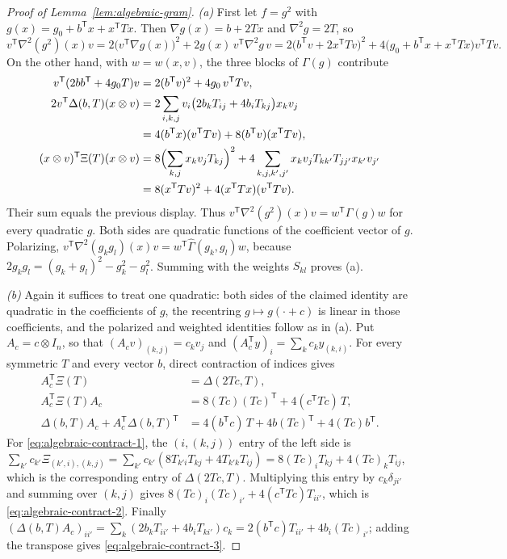 \begin{proof}[Proof of Lemma~\ref{lem:algebraic-gram}]
\emph{(a)} First let $f=g^2$ with $g(x)=g_0+b^{\mathsf T}x+x^{\mathsf T}Tx$.
Then $\nabla g(x)=b+2Tx$ and $\nabla^2g=2T$, so
\[
 v^{\mathsf T}\nabla^2(g^2)(x)v
 =2\bigl(v^{\mathsf T}\nabla g(x)\bigr)^2+2g(x)\,v^{\mathsf T}\nabla^2g\,v
 =2\bigl(b^{\mathsf T}v+2x^{\mathsf T}Tv\bigr)^2
  +4\bigl(g_0+b^{\mathsf T}x+x^{\mathsf T}Tx\bigr)v^{\mathsf T}Tv .
\]
On the other hand, with $w=w(x,v)$, the three blocks of $\Gamma(g)$
contribute
\[
\begin{aligned}
 v^{\mathsf T}(2bb^{\mathsf T}+4g_0T)v
   &=2(b^{\mathsf T}v)^2+4g_0\,v^{\mathsf T}Tv,\\
 2v^{\mathsf T}\Delta(b,T)(x\otimes v)
   &=2\sum_{i,k,j}v_i\bigl(2b_kT_{ij}+4b_iT_{kj}\bigr)x_kv_j\\
   &=4(b^{\mathsf T}x)(v^{\mathsf T}Tv)+8(b^{\mathsf T}v)(x^{\mathsf T}Tv),\\
 (x\otimes v)^{\mathsf T}\Xi(T)(x\otimes v)
   &=8\Bigl(\sum_{k,j}x_kv_jT_{kj}\Bigr)^2
     +4\sum_{k,j,k',j'}x_kv_jT_{kk'}T_{jj'}x_{k'}v_{j'}\\
   &=8(x^{\mathsf T}Tv)^2+4(x^{\mathsf T}Tx)(v^{\mathsf T}Tv).
\end{aligned}
\]
Their sum equals the previous display. Thus
$v^{\mathsf T}\nabla^2(g^2)(x)v=w^{\mathsf T}\Gamma(g)w$ for every quadratic
$g$. Both sides are quadratic functions of the coefficient vector of $g$.
Polarizing, $v^{\mathsf T}\nabla^2(g_kg_l)(x)v=w^{\mathsf
T}\widehat\Gamma(g_k,g_l)w$, because
$2g_kg_l=(g_k+g_l)^2-g_k^2-g_l^2$. Summing with the weights $S_{kl}$ proves
(a).

\emph{(b)} Again it suffices to treat one quadratic: both sides of the
claimed identity are quadratic in the coefficients of $g$, the recentring
$g\mapsto g(\cdot+c)$ is linear in those coefficients, and the polarized and
weighted identities follow as in (a). Put $A_c=c\otimes I_n$, so that
$(A_cv)_{(k,j)}=c_kv_j$ and $(A_c^{\mathsf T}y)_i=\sum_kc_ky_{(k,i)}$. For
every symmetric $T$ and every vector $b$, direct contraction of indices gives
\begin{align}
 A_c^{\mathsf T}\Xi(T)&=\Delta(2Tc,T),
 \label{eq:algebraic-contract-1}\\
 A_c^{\mathsf T}\Xi(T)A_c&=8(Tc)(Tc)^{\mathsf T}+4(c^{\mathsf T}Tc)\,T,
 \label{eq:algebraic-contract-2}\\
 \Delta(b,T)A_c+A_c^{\mathsf T}\Delta(b,T)^{\mathsf T}
  &=4(b^{\mathsf T}c)\,T+4b(Tc)^{\mathsf T}+4(Tc)b^{\mathsf T}.
 \label{eq:algebraic-contract-3}
\end{align}
For \eqref{eq:algebraic-contract-1}, the $(i,(k,j))$ entry of the left side is
$\sum_{k'}c_{k'}\Xi_{(k',i),(k,j)}
=\sum_{k'}c_{k'}(8T_{k'i}T_{kj}+4T_{k'k}T_{ij})
=8(Tc)_iT_{kj}+4(Tc)_kT_{ij}$, which is the corresponding entry of
$\Delta(2Tc,T)$. Multiplying this entry by $c_k\delta_{ji'}$ and summing over
$(k,j)$ gives $8(Tc)_i(Tc)_{i'}+4(c^{\mathsf T}Tc)T_{ii'}$, which is
\eqref{eq:algebraic-contract-2}. Finally $(\Delta(b,T)A_c)_{ii'}
=\sum_k(2b_kT_{ii'}+4b_iT_{ki'})c_k=2(b^{\mathsf T}c)T_{ii'}+4b_i(Tc)_{i'}$;
adding the transpose gives \eqref{eq:algebraic-contract-3}.


\end{proof}
